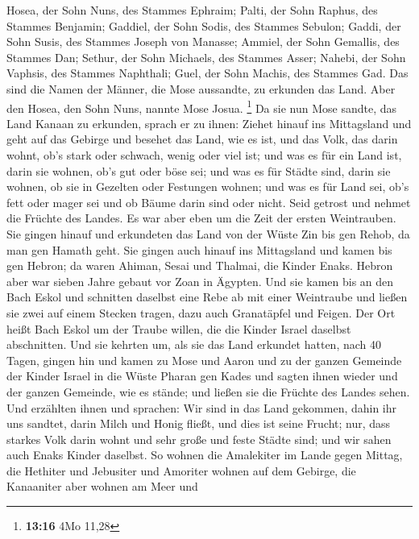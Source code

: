  Hosea, der Sohn Nuns, des Stammes Ephraim; 
Palti, der Sohn Raphus, des Stammes Benjamin;  Gaddiel, der
Sohn Sodis, des Stammes Sebulon;  Gaddi, der Sohn Susis,
des Stammes Joseph von Manasse;  Ammiel, der Sohn Gemallis,
des Stammes Dan;  Sethur, der Sohn Michaels, des Stammes
Asser;  Nahebi, der Sohn Vaphsis, des Stammes Naphthali;
 Guel, der Sohn Machis, des Stammes Gad.  Das
sind die Namen der Männer, die Mose aussandte, zu erkunden das Land.
Aber den Hosea, den Sohn Nuns, nannte Mose Josua. \footnote{\textbf{13:16}
  4Mo 11,28}  Da sie nun Mose sandte, das Land Kanaan zu
erkunden, sprach er zu ihnen: Ziehet hinauf ins Mittagsland und geht auf
das Gebirge  und besehet das Land, wie es ist, und das
Volk, das darin wohnt, ob's stark oder schwach, wenig oder viel ist;
 und was es für ein Land ist, darin sie wohnen, ob's gut
oder böse sei; und was es für Städte sind, darin sie wohnen, ob sie in
Gezelten oder Festungen wohnen;  und was es für Land sei,
ob's fett oder mager sei und ob Bäume darin sind oder nicht. Seid
getrost und nehmet die Früchte des Landes. Es war aber eben um die Zeit
der ersten Weintrauben.  Sie gingen hinauf und erkundeten
das Land von der Wüste Zin bis gen Rehob, da man gen Hamath geht.
 Sie gingen auch hinauf ins Mittagsland und kamen bis gen
Hebron; da waren Ahiman, Sesai und Thalmai, die Kinder Enaks. Hebron
aber war sieben Jahre gebaut vor Zoan in Ägypten.  Und sie
kamen bis an den Bach Eskol und schnitten daselbst eine Rebe ab mit
einer Weintraube und ließen sie zwei auf einem Stecken tragen, dazu auch
Granatäpfel und Feigen.  Der Ort heißt Bach Eskol um der
Traube willen, die die Kinder Israel daselbst abschnitten. 
Und sie kehrten um, als sie das Land erkundet hatten, nach 40 Tagen,
 gingen hin und kamen zu Mose und Aaron und zu der ganzen
Gemeinde der Kinder Israel in die Wüste Pharan gen Kades und sagten
ihnen wieder und der ganzen Gemeinde, wie es stände; und ließen sie die
Früchte des Landes sehen.  Und erzählten ihnen und
sprachen: Wir sind in das Land gekommen, dahin ihr uns sandtet, darin
Milch und Honig fließt, und dies ist seine Frucht;  nur,
dass starkes Volk darin wohnt und sehr große und feste Städte sind; und
wir sahen auch Enaks Kinder daselbst.  So wohnen die
Amalekiter im Lande gegen Mittag, die Hethiter und Jebusiter und
Amoriter wohnen auf dem Gebirge, die Kanaaniter aber wohnen am Meer und

